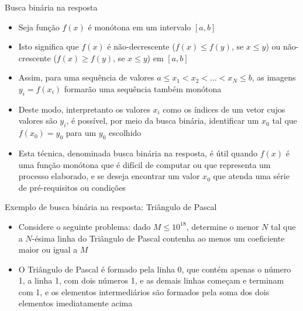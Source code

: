 \begin{frame}[fragile]{Busca binária na resposta}

    \begin{itemize}
        \item Seja função $f(x)$ é monótona em um intervalo $[a, b]$

        \item Isto significa que $f(x)$ é não-decrescente ($f(x) \leq f(y)$, se $x\leq y$) ou
            não-crescente ($f(x) \geq f(y)$, se $x\leq y$) em $[a, b]$

        \item Assim, para uma sequência de valores $a\leq x_1 < x_2 < \ldots < x_N\leq b$, as 
            imagens $y_i = f(x_i)$ formarão uma sequência também monótona

        \item Deste modo, interpretanto os valores $x_i$ como os índices de um vetor cujos valores
            são $y_i$, é possível, por meio da busca binária, identificar um $x_0$ tal que
            $f(x_0) = y_0$ para um $y_0$ escolhido

        \item Esta técnica, denominada busca binária na resposta, é útil quando $f(x)$ é uma função
            monótona que é difícil de computar
            ou que representa um processo elaborado, e se deseja encontrar um valor $x_0$ que
            atenda uma série de pré-requisitos ou condições
    \end{itemize}

\end{frame}

\begin{frame}[fragile]{Exemplo de busca binária na resposta: Triângulo de Pascal}

    \begin{itemize}
        \item Considere o seguinte problema: dado $M \leq 10^{18}$, determine o menor $N$ tal que
            a $N$-ésima linha do Triângulo de Pascal contenha ao menos um coeficiente maior ou
            igual a $M$

        \item O Triângulo de Pascal é formado pela linha 0, que contém apenas o número 1, a linha
            1, com dois números 1, e as demais linhas começam e terminam com 1, e os elementos
            intermediários são formados pela soma dos dois elementos imediatamente acima

            

    \end{itemize}

\end{frame}

